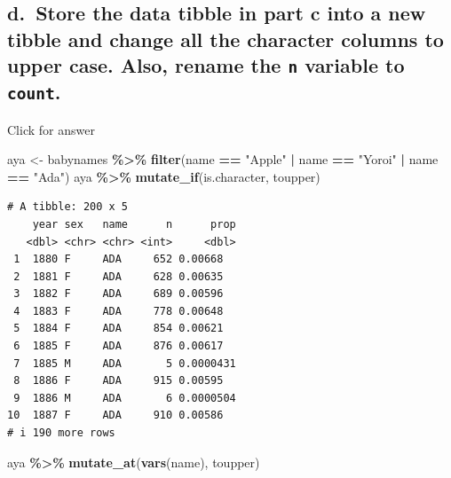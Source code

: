 \documentclass[
]{book}
\newenvironment{Shaded}{\begin{snugshade}}{\end{snugshade}}
\newcommand{\FunctionTok}[1]{\textcolor[rgb]{0.13,0.29,0.53}{\textbf{#1}}}
\newcommand{\NormalTok}[1]{#1}
\newcommand{\OtherTok}[1]{\textcolor[rgb]{0.56,0.35,0.01}{#1}}
\newcommand{\SpecialCharTok}[1]{\textcolor[rgb]{0.81,0.36,0.00}{\textbf{#1}}}
\newcommand{\StringTok}[1]{\textcolor[rgb]{0.31,0.60,0.02}{#1}}
\begin{document}
\hypertarget{d.-store-the-data-tibble-in-part-c-into-a-new-tibble-and-change-all-the-character-columns-to-upper-case.-also-rename-the-n-variable-to-count.}{%
\subsection{\texorpdfstring{d.~Store the data tibble in part c into a new tibble and change all the character columns to upper case. Also, rename the \texttt{n} variable to \texttt{count}.}{d.~Store the data tibble in part c into a new tibble and change all the character columns to upper case. Also, rename the n variable to count.}}\label{d.-store-the-data-tibble-in-part-c-into-a-new-tibble-and-change-all-the-character-columns-to-upper-case.-also-rename-the-n-variable-to-count.}}

Click for answer

\begin{Shaded}
\begin{Highlighting}[]
\NormalTok{aya }\OtherTok{\textless{}{-}}\NormalTok{ babynames }\SpecialCharTok{\%\textgreater{}\%} \FunctionTok{filter}\NormalTok{(name }\SpecialCharTok{==} \StringTok{"Apple"} \SpecialCharTok{|}\NormalTok{ name }\SpecialCharTok{==} \StringTok{"Yoroi"} \SpecialCharTok{|}\NormalTok{ name }\SpecialCharTok{==} \StringTok{"Ada"}\NormalTok{)}
\NormalTok{aya }\SpecialCharTok{\%\textgreater{}\%} \FunctionTok{mutate\_if}\NormalTok{(is.character, toupper)}
\end{Highlighting}
\end{Shaded}

\begin{verbatim}
# A tibble: 200 x 5
    year sex   name      n      prop
   <dbl> <chr> <chr> <int>     <dbl>
 1  1880 F     ADA     652 0.00668  
 2  1881 F     ADA     628 0.00635  
 3  1882 F     ADA     689 0.00596  
 4  1883 F     ADA     778 0.00648  
 5  1884 F     ADA     854 0.00621  
 6  1885 F     ADA     876 0.00617  
 7  1885 M     ADA       5 0.0000431
 8  1886 F     ADA     915 0.00595  
 9  1886 M     ADA       6 0.0000504
10  1887 F     ADA     910 0.00586  
# i 190 more rows
\end{verbatim}

\begin{Shaded}
\begin{Highlighting}[]
\NormalTok{aya }\SpecialCharTok{\%\textgreater{}\%} \FunctionTok{mutate\_at}\NormalTok{(}\FunctionTok{vars}\NormalTok{(name), toupper)}
\end{Highlighting}
\end{Shaded}
\end{document}
